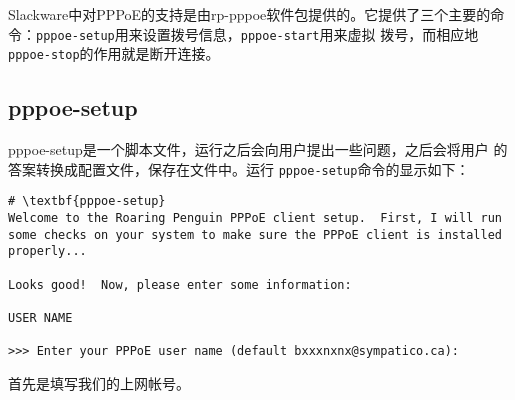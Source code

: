 Slackware中对PPPoE的支持是由rp-pppoe软件包提供的。它提供了三个主要的命
令：\texttt{pppoe-setup}用来设置拨号信息，\texttt{pppoe-start}用来虚拟
拨号，而相应地\texttt{pppoe-stop}的作用就是断开连接。

\subsection{pppoe-setup}
\label{sec:networkConfiguration:pppoe:pppoesetup}

pppoe-setup是一个脚本文件，运行之后会向用户提出一些问题，之后会将用户
的答案转换成配置文件，保存在文件中。运行
\texttt{pppoe-setup}命令的显示如下：
\begin{Verbatim}[frame=single,commandchars=\\\{\}]
# \textbf{pppoe-setup}
Welcome to the Roaring Penguin PPPoE client setup.  First, I will run
some checks on your system to make sure the PPPoE client is installed
properly...

Looks good!  Now, please enter some information:

USER NAME

>>> Enter your PPPoE user name (default bxxxnxnx@sympatico.ca):
\end{Verbatim}
首先是填写我们的上网帐号。

